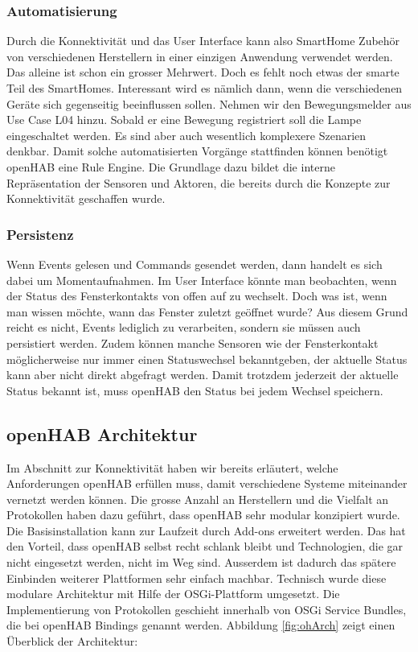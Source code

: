 \subsubsection{Automatisierung}
Durch die Konnektivität und das User Interface kann also SmartHome Zubehör von verschiedenen Herstellern in einer einzigen Anwendung verwendet werden. Das alleine ist schon ein grosser Mehrwert. Doch es fehlt noch etwas der smarte Teil des SmartHomes. Interessant wird es nämlich dann, wenn die verschiedenen Geräte sich gegenseitig beeinflussen sollen. Nehmen wir den Bewegungsmelder aus Use Case L04 hinzu. Sobald er eine Bewegung registriert soll die Lampe eingeschaltet werden. Es sind aber auch wesentlich komplexere Szenarien denkbar. Damit solche automatisierten Vorgänge stattfinden können benötigt openHAB eine Rule Engine. Die Grundlage dazu bildet die interne Repräsentation der Sensoren und Aktoren, die bereits durch die Konzepte zur Konnektivität geschaffen wurde.

\subsubsection{Persistenz}
Wenn Events gelesen und Commands gesendet werden, dann handelt es sich dabei um Momentaufnahmen. Im User Interface könnte man beobachten, wenn der Status des Fensterkontakts von offen auf zu wechselt. Doch was ist, wenn man wissen möchte, wann das Fenster zuletzt geöffnet wurde? Aus diesem Grund reicht es nicht, Events lediglich zu verarbeiten, sondern sie müssen auch persistiert werden. Zudem können manche Sensoren wie der Fensterkontakt möglicherweise nur immer einen Statuswechsel bekanntgeben, der aktuelle Status kann aber nicht direkt abgefragt werden. Damit trotzdem jederzeit der aktuelle Status bekannt ist, muss openHAB den Status bei jedem Wechsel speichern. 


\subsection{openHAB Architektur}
Im Abschnitt zur Konnektivität haben wir bereits erläutert, welche Anforderungen openHAB erfüllen muss, damit verschiedene Systeme miteinander vernetzt werden können. Die grosse Anzahl an Herstellern und die Vielfalt an Protokollen haben dazu geführt, dass openHAB sehr modular konzipiert wurde. Die Basisinstallation kann zur Laufzeit durch Add-ons erweitert werden. Das hat den Vorteil, dass openHAB selbst recht schlank bleibt und Technologien, die gar nicht eingesetzt werden, nicht im Weg sind. Ausserdem ist dadurch das spätere Einbinden weiterer Plattformen sehr einfach machbar. Technisch wurde diese modulare Architektur mit Hilfe der OSGi-Plattform umgesetzt. Die Implementierung von Protokollen geschieht innerhalb von OSGi Service Bundles, die bei openHAB Bindings genannt werden. Abbildung \ref{fig:ohArch} zeigt einen Überblick der Architektur:

